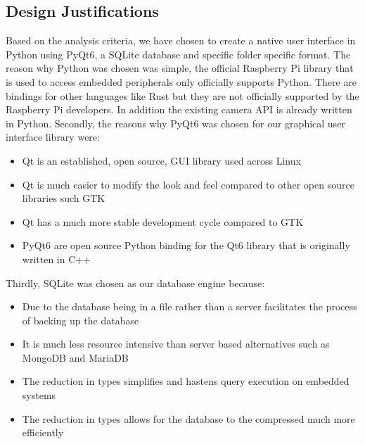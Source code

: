 \subsection{Design Justifications}
Based on the analysis criteria, we have chosen to create a native user interface in Python using PyQt6, a SQLite database and specific folder specific format. The reason why Python was chosen was simple, the official Raspberry Pi library that is used to access embedded peripherals only officially supports Python. There are bindings for other languages like Rust but they are not officially supported by the Raspberry Pi developers. In addition the existing camera API  is already written in Python. Secondly, the reasons why PyQt6 was chosen for our graphical user interface library were:
\begin{itemize}
	\item Qt is an established, open source, GUI library used across Linux
	\item Qt is much easier to modify the look and feel compared to other open source libraries such GTK
	\item Qt has a much more stable development cycle compared to GTK
	\item PyQt6 are open source Python binding for the Qt6 library that is originally written in C++
\end{itemize}
Thirdly, SQLite was chosen as our database engine because:
\begin{itemize}
	\item Due to the database being in a file rather than a server facilitates the process of backing up the database
	\item It is much less resource intensive than server based alternatives such as MongoDB and MariaDB
	\item The reduction in types simplifies and hastens query execution on embedded systems
	\item The reduction in types allows for the database to the compressed much more efficiently
\end{itemize}
